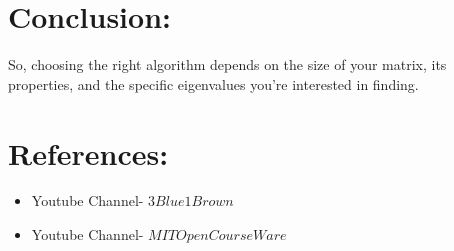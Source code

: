\documentclass[journal,20pt,onecolumn]{IEEEtran}
\theoremstyle{remark}
\begin{document}
\section{Conclusion:}So, choosing the right algorithm depends on the size of your matrix, its properties, and the specific eigenvalues you're interested in finding.
\section{References:}
\begin{itemize}
	\item Youtube Channel- $3Blue1Brown$\\
	\item Youtube Channel- $MIT$$OpenCourseWare$
\end{itemize}
\end{document}
